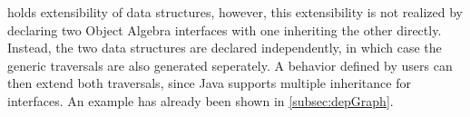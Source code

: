 \name holds extensibility of data structures, however, this extensibility is not realized by declaring two Object Algebra interfaces with one inheriting the other directly. Instead, the two data structures are declared independently, in which case the generic traversals are also generated seperately. A behavior defined by users can then extend both traversals, since Java supports multiple inheritance for interfaces. An example has already been shown in \ref{subsec:depGraph}.
\begin{comment}
Another advantage of \name is that it is quite easy to extend with new
types of traversals.
\bruno{Say something about this}

\tijs{It's this many SLOC:  885}
\bruno{Should we talk about code size? How big is the \name framework?}
\end{comment}
\begin{comment}
To address this problem, we provide a framework \name, which utilizes \emph{Java Annotation} to generate query and transformation interfaces based on the \emph{Object Algebra Interface}. For the below code:
\begin{lstlisting}[numbers=none]
@Algebra
public interface ExpAlg<Exp> {
	Exp Var(String s);
	Exp Lit(int i);
	Exp Add(Exp e1, Exp e2);
}
\end{lstlisting}
with the annotation "$@$Algebra", the framework will generate the boilerplate codes for us automatically. As for our ExpAlg example, the following directory structure will be generated by the library.

\dirtree{%
 .1 src/.
 .2 query/.
 .3 ExpAlgQuery.
 .3 G\_ExpAlgQuery.
 .2 transform/.
 .3 ExpAlgTransform.
 .3 G\_ExpAlgTransform.
}

Here the automatically generated ExpAlgQuery, G\_ExpAlgQuery, ExpAlgTransform and G\_ExpAlgTransform are exactly the same code as we discussed in the previous sections. Developers can implement interesting methods by inheriting from these generic classes without worrying about the traversing work.


With our framework \name, when programming with query and
transformations, the programmer can skip the intermediate steps such
as constructing generic queries and transformations, but only focus on
rewriting the interesting cases. For instance, in our ExpAlg example,
to implement FreeVars algebra, we can simply override the
\lstinline{Exp Var(String s)} method of \lstinline{class ExpAlgQuery}
to return variable name, and provide the specific monoid needed, which
in this case will be a \lstinline{StringListMonoid}. While the
SubstVars algebra can be realized by overriding the \lstinline{Exp
  Var(String s)} method of ExpAlgTransform interface, which
substitutes variable names as specified.
\end{comment}

